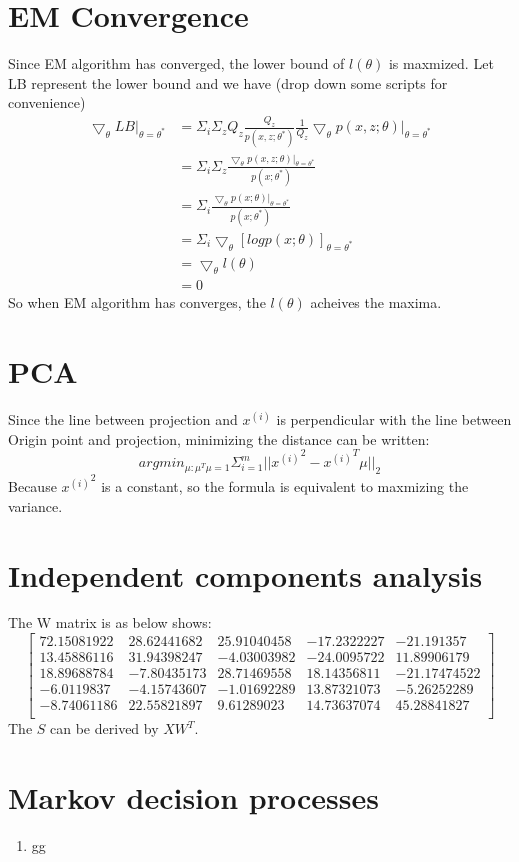 \documentclass[12pt]{article}
\begin{document}
    \section*{EM Convergence }
    Since EM algorithm has converged, the lower bound of $l(\theta)$ is maxmized.
    Let LB represent the lower bound and we have (drop down some scripts for convenience)
    \begin{equation*}
        \begin{split}
            \bigtriangledown_\theta LB |_{\theta=\theta^*} &= \Sigma_i \Sigma_z Q_z \frac{Q_z}{p(x,z;\theta^*)}\frac{1}{Q_z} \bigtriangledown_\theta p(x,z;\theta) |_{\theta=\theta^*} \\
            &= \Sigma_i \Sigma_z \frac{\bigtriangledown_\theta p(x,z;\theta) |_{\theta=\theta^*}}{p(x;\theta^*)} \\
            &= \Sigma_i \frac{\bigtriangledown_\theta p(x;\theta) |_{\theta=\theta^*}}{p(x;\theta^*)} \\
            &= \Sigma_i \bigtriangledown_\theta [log p(x;\theta)]_{\theta=\theta^*} \\
            &= \bigtriangledown_\theta l(\theta) \\
            &= 0
        \end{split}
    \end{equation*}
    So when EM algorithm has converges, the $l(\theta)$ acheives the maxima.
    

    \section*{PCA}
    Since the line between projection and $x^{(i)}$ is perpendicular with the line between Origin point and projection, 
    minimizing the distance can be written:
    $$arg {min}_{\mu : \mu^T \mu=1 } \Sigma_{i=1}^m ||{x^{(i)}}^2-{x^{(i)}}^{T} \mu||_2$$
    Because ${x^{(i)}}^2$ is a constant, so the formula is equivalent to maxmizing the variance.


    \section*{Independent components analysis}
    The W matrix is as below shows:
   $$\left[ 
    \begin{matrix} 
    72.15081922&  28.62441682&  25.91040458& -17.2322227&  -21.191357 \\
    13.45886116 & 31.94398247&  -4.03003982& -24.0095722&   11.89906179\\
    18.89688784 & -7.80435173 & 28.71469558&  18.14356811& -21.17474522\\
    -6.0119837  & -4.15743607 & -1.01692289&  13.87321073&  -5.26252289\\
    -8.74061186 & 22.55821897&   9.61289023 & 14.73637074&  45.28841827\\
    \end{matrix}
    \right]$$
    The $S$ can be derived by $XW^T$.

    \newpage
    \section*{Markov decision processes}
    \begin{enumerate}[label=(\alph*)]
        \item gg
    \end{enumerate}
\end{document}

